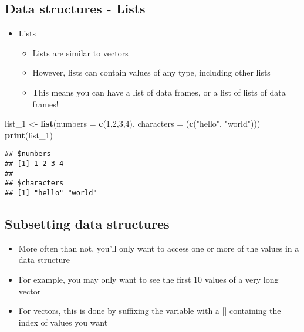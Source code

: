 \documentclass[]{article}
\newenvironment{Shaded}{\begin{snugshade}}{\end{snugshade}}
\newcommand{\KeywordTok}[1]{\textcolor[rgb]{0.13,0.29,0.53}{\textbf{#1}}}
\newcommand{\DataTypeTok}[1]{\textcolor[rgb]{0.13,0.29,0.53}{#1}}
\newcommand{\DecValTok}[1]{\textcolor[rgb]{0.00,0.00,0.81}{#1}}
\newcommand{\StringTok}[1]{\textcolor[rgb]{0.31,0.60,0.02}{#1}}
\newcommand{\NormalTok}[1]{#1}
\providecommand{\tightlist}{%
  \setlength{\itemsep}{0pt}\setlength{\parskip}{0pt}}
\begin{document}
\subsection{Data structures - Lists}\label{data-structures---lists}

\begin{itemize}
\tightlist
\item
  Lists

  \begin{itemize}
  \tightlist
  \item
    Lists are similar to vectors
  \item
    However, lists can contain values of any type, including other lists
  \item
    This means you can have a list of data frames, or a list of lists of
    data frames!
  \end{itemize}
\end{itemize}

\begin{Shaded}
\begin{Highlighting}[]
\NormalTok{list_}\DecValTok{1}\NormalTok{ <-}\StringTok{ }\KeywordTok{list}\NormalTok{(}\DataTypeTok{numbers =} \KeywordTok{c}\NormalTok{(}\DecValTok{1}\NormalTok{,}\DecValTok{2}\NormalTok{,}\DecValTok{3}\NormalTok{,}\DecValTok{4}\NormalTok{), }\DataTypeTok{characters =}\NormalTok{ (}\KeywordTok{c}\NormalTok{(}\StringTok{"hello"}\NormalTok{, }\StringTok{"world"}\NormalTok{)))}
\KeywordTok{print}\NormalTok{(list_}\DecValTok{1}\NormalTok{)}
\end{Highlighting}
\end{Shaded}

\begin{verbatim}
## $numbers
## [1] 1 2 3 4
## 
## $characters
## [1] "hello" "world"
\end{verbatim}

\subsection{Subsetting data
structures}\label{subsetting-data-structures}

\begin{itemize}
\tightlist
\item
  More often than not, you'll only want to access one or more of the
  values in a data structure
\item
  For example, you may only want to see the first 10 values of a very
  long vector
\item
  For vectors, this is done by suffixing the variable with a {[}{]}
  containing the index of values you want
\end{itemize}
\end{document}
